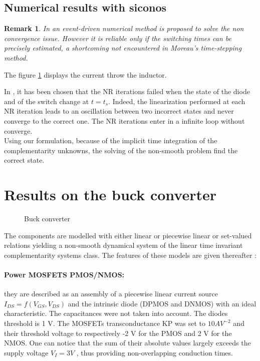 \documentclass{article}
\newtheorem{remark}{Remark}
\begin{document}
\subsection{Numerical results with {\sc siconos}}
\label{section32}


\begin{remark}
In \cite{maffezzoni2006} an event-driven numerical method is proposed to solve the non convergence issue. However it is reliable only if the switching times can be precisely estimated, a shortcoming not encountered  in Moreau's time-stepping method. 
\end{remark}

The figure \ref{fig:SIMU_CS} displays the current throw the inductor.

 \begin{figure}[h]
   
  \label{fig:SIMU_CS}
 \end{figure}

 In \cite{maffezzoni2006}, it has been chosen that the NR iterations failed when the state of the
 diode and of the switch change at $t=t_s$. Indeed, the linearization performed at each NR iteration leads to an oscillation between two incorrect
 states and never converge to the correct one. The NR iterations enter in a infinite loop without converge. \\
 Using our formulation, because of the implicit time integration of the complementarity unknowns, the solving of the non-smooth problem find the correct state.

 

\section{Results on the buck converter}
\label{section4}
\begin{figure}[h]
\centerline{
 \scalebox{1.0}{
    
 }
}
\caption{Buck converter}
\label{fig-Buck-converter}
\end{figure}
The components are modelled with either linear or piecewise linear or set-valued relations yielding a non-smooth dynamical system of the linear time invariant complementarity systems class. The features of these models are given thereafter :
\paragraph{Power MOSFETS PMOS/NMOS:} they are described as an assembly of a
piecewise linear current source $I_{DS} = f(V_{GS}, V_{DS})$ and the intrinsic diode
(DPMOS and DNMOS) with an ideal characteristic.
The capacitances were not taken into account. The diodes threshold is
1 V. The MOSFETs transconductance KP was set to $10 AV^{-2}$ and
their threshold voltage to respectively -2 V for the PMOS and 2 V for
the NMOS. One can notice that the sum of their absolute values largely
exceeds the supply voltage $V_{I} = 3 V$ , thus providing non-overlapping
conduction times.
\end{document}
